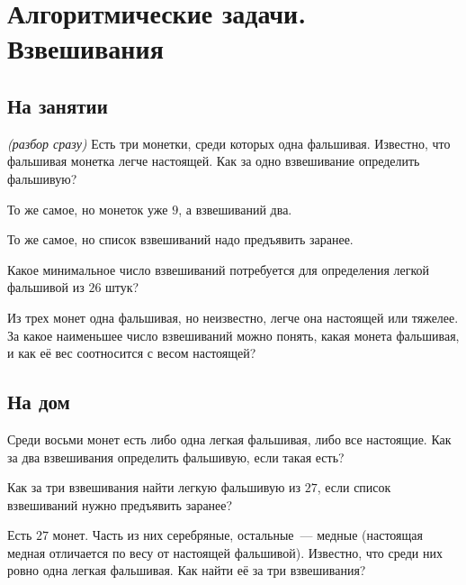 

\section*{Алгоритмические задачи. Взвешивания}



\subsection*{На занятии}

\begin{problems}

\item\emph{(разбор сразу)}
Есть три монетки, среди которых одна фальшивая.
Известно, что фальшивая монетка легче настоящей.
Как за одно взвешивание определить фальшивую?

\item
То же самое, но монеток уже $9$, а взвешиваний два.

\item
То же самое, но список взвешиваний надо предъявить заранее.

\item
Какое минимальное число взвешиваний потребуется для определения легкой фальшивой из
$26$ штук?

\item
Из трех монет одна фальшивая, но неизвестно, легче она настоящей или тяжелее.
За какое наименьшее число взвешиваний можно понять, какая монета фальшивая, и как её
вес соотносится с весом настоящей?

\end{problems}

\subsection*{На дом}

\begin{problems}

\item
Среди восьми монет есть либо одна легкая фальшивая, либо все настоящие.
Как за два взвешивания определить фальшивую, если такая есть?

\item
Как за три взвешивания найти легкую фальшивую из $27$, если список взвешиваний нужно
предъявить заранее?

\item
Есть $27$ монет.
Часть из них серебряные, остальные~--- медные
(настоящая медная отличается по весу от настоящей фальшивой).
Известно, что среди них ровно одна легкая фальшивая.
Как найти её за три взвешивания?

\end{problems}

